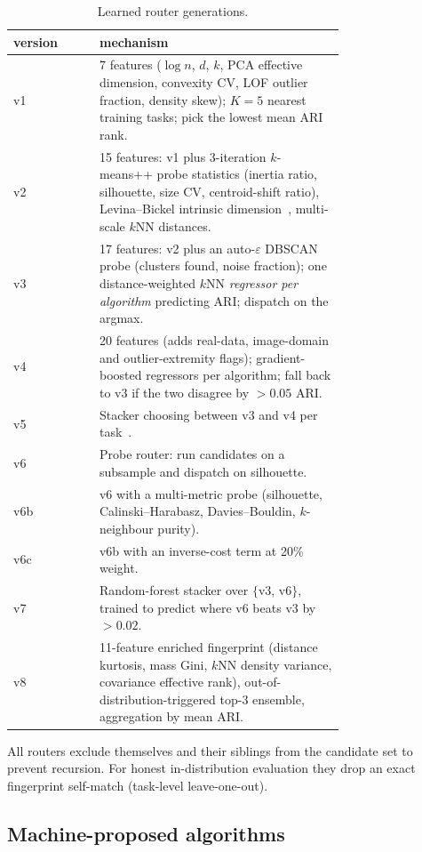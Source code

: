 \documentclass[11pt,a4paper]{article}
\begin{document}
\begin{table}[t]
  \centering\small
  \caption{Learned router generations.}
  \label{tab:routers}
  \begin{tabular}{lp{0.74\linewidth}}
    \toprule
    version & mechanism \\
    \midrule
    v1 & 7 features ($\log n$, $d$, $k$, PCA effective dimension, convexity CV, LOF outlier fraction, density skew); $K{=}5$ nearest training tasks; pick the lowest mean ARI rank. \\
    v2 & 15 features: v1 plus 3-iteration $k$-means++ probe statistics (inertia ratio, silhouette, size CV, centroid-shift ratio), Levina--Bickel intrinsic dimension~\cite{levina2005maximum}, multi-scale $k$NN distances. \\
    v3 & 17 features: v2 plus an auto-$\varepsilon$ DBSCAN probe (clusters found, noise fraction); one distance-weighted $k$NN \emph{regressor per algorithm} predicting ARI; dispatch on the argmax. \\
    v4 & 20 features (adds real-data, image-domain and outlier-extremity flags); gradient-boosted regressors per algorithm; fall back to v3 if the two disagree by $> 0.05$ ARI. \\
    v5 & Stacker choosing between v3 and v4 per task~\cite{wolpert1992stacked}. \\
    v6 & Probe router: run candidates on a subsample and dispatch on silhouette. \\
    v6b & v6 with a multi-metric probe (silhouette, Calinski--Harabasz, Davies--Bouldin, $k$-neighbour purity). \\
    v6c & v6b with an inverse-cost term at 20\% weight. \\
    v7 & Random-forest stacker over $\{$v3, v6$\}$, trained to predict where v6 beats v3 by $> 0.02$. \\
    v8 & 11-feature enriched fingerprint (distance kurtosis, mass Gini, $k$NN density variance, covariance effective rank), out-of-distribution-triggered top-3 ensemble, aggregation by mean ARI. \\
    \bottomrule
  \end{tabular}
\end{table}

All routers exclude themselves and their siblings from the candidate set to
prevent recursion. For honest in-distribution evaluation they drop an exact
fingerprint self-match (task-level leave-one-out).

\subsection{Machine-proposed algorithms}
\end{document}
